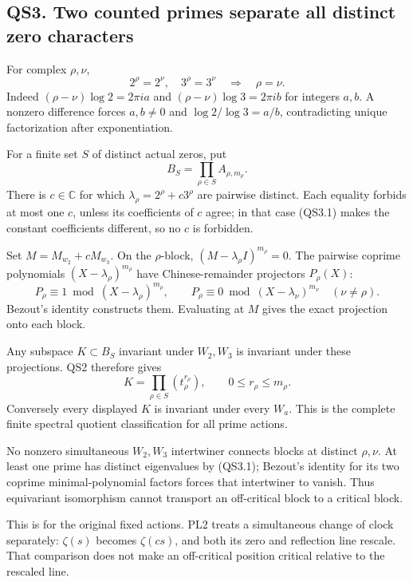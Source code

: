 \subsection{QS3. Two counted primes separate all distinct zero
characters}\label{qs3.-two-counted-primes-separate-all-distinct-zero-characters}

For complex \(\rho,\nu\), \[
2^\rho=2^\nu,\quad3^\rho=3^\nu
\quad\Longrightarrow\quad \rho=\nu.
\tag{QS3.1}
\] Indeed \((\rho-\nu)\log2=2\pi ia\) and \((\rho-\nu)\log3=2\pi ib\)
for integers \(a,b\). A nonzero difference forces \(a,b\ne0\) and
\(\log2/\log3=a/b\), contradicting unique factorization after
exponentiation.

For a finite set \(S\) of distinct actual zeros, put \[
B_S=\prod_{\rho\in S}A_{\rho,m_\rho}.
\] There is \(c\in\mathbb C\) for which \(\lambda_\rho=2^\rho+c3^\rho\)
are pairwise distinct. Each equality forbids at most one \(c\), unless
its coefficients of \(c\) agree; in that case (QS3.1) makes the constant
coefficients different, so no \(c\) is forbidden.

Set \(M=M_{w_2}+cM_{w_3}\). On the \(\rho\)-block,
\((M-\lambda_\rho I)^{m_\rho}=0\). The pairwise coprime polynomials
\((X-\lambda_\rho)^{m_\rho}\) have Chinese-remainder projectors
\(P_\rho(X)\): \[
P_\rho\equiv1\bmod(X-\lambda_\rho)^{m_\rho},\qquad
P_\rho\equiv0\bmod(X-\lambda_\nu)^{m_\nu}\quad(\nu\ne\rho).
\] Bezout's identity constructs them. Evaluating at \(M\) gives the
exact projection onto each block.

Any subspace \(K\subset B_S\) invariant under \(W_2,W_3\) is invariant
under these projections. QS2 therefore gives \[
K=\prod_{\rho\in S}(t_\rho^{r_\rho}),\qquad
0\le r_\rho\le m_\rho.
\tag{QS3.2}
\] Conversely every displayed \(K\) is invariant under every \(W_a\).
This is the complete finite spectral quotient classification for all
prime actions.

No nonzero simultaneous \(W_2,W_3\) intertwiner connects blocks at
distinct \(\rho,\nu\). At least one prime has distinct eigenvalues by
(QS3.1); Bezout's identity for its two coprime minimal-polynomial
factors forces that intertwiner to vanish. Thus equivariant isomorphism
cannot transport an off-critical block to a critical block.

This is for the original fixed actions. PL2 treats a simultaneous change
of clock separately: \(\zeta(s)\) becomes \(\zeta(cs)\), and both its
zero and reflection line rescale. That comparison does not make an
off-critical position critical relative to the rescaled line.

